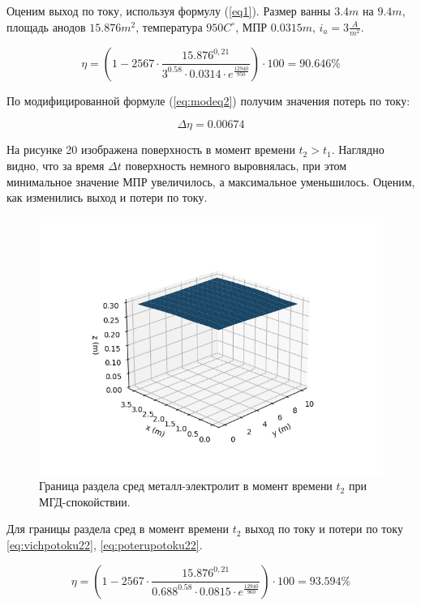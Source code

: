 \documentclass{article}
\begin{document}
Оценим выход по току, используя формулу (\ref{eq1}). Размер ванны $3.4 m$ на $9.4 m$, площадь анодов $15.876 m^2$, температура $950 C^{\circ}$, МПР $0.0315 m$, $i_a = 3 \frac{A}{m^2}$.

\begin{equation}
\eta=(1-2567 \cdot \frac{15.876^{0,21}}{3^{0.58} \cdot 0.0314 \cdot e^{\frac{12940}{950}}}) \cdot 100 = 90.646 \%
\end{equation}

По модифицированной формуле (\ref{eq:modeq2}) получим значения потерь по току:

\begin{equation}
\Delta \eta = 0.00674
\end{equation}

На рисунке 20 изображена поверхность в момент времени $t_2 > t_1$. Наглядно видно, что за время $\Delta t$ поверхность немного выровнялась, при этом минимальное значение МПР увеличилось, а максимальное уменьшилось. Оценим, как изменились выход и потери по току.

\begin{figure}[H]
\centering
\includegraphics[width=0.8\linewidth]{h2.png}
\caption{Граница раздела сред металл-электролит в момент времени $t_2$ при МГД-спокойствии. \label{fig:hsurf-}}
\end{figure}

Для границы раздела сред в момент времени $t_2$ выход по току и потери по току \ref{eq:vichpotoku22}, \ref{eq:poterupotoku22}.

\begin{equation}\label{eq:vichpotoku22}
\eta=(1-2567 \cdot \frac{15.876^{0,21}}{0.688^{0.58} \cdot 0.0815 \cdot e^{\frac{12940}{960}}}) \cdot 100 = 93.594 \%
\end{equation}
\end{document}
